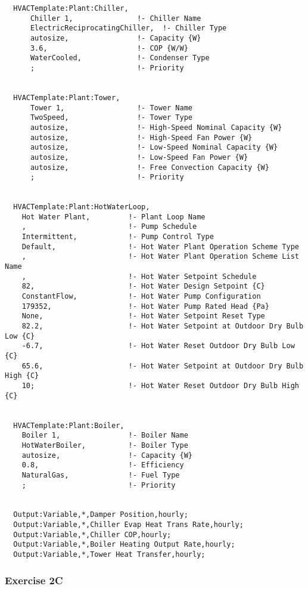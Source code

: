 \begin{lstlisting}
  HVACTemplate:Plant:Chiller,
      Chiller 1,               !- Chiller Name
      ElectricReciprocatingChiller,  !- Chiller Type
      autosize,                !- Capacity {W}
      3.6,                     !- COP {W/W}
      WaterCooled,             !- Condenser Type
      ;                        !- Priority


  HVACTemplate:Plant:Tower,
      Tower 1,                 !- Tower Name
      TwoSpeed,                !- Tower Type
      autosize,                !- High-Speed Nominal Capacity {W}
      autosize,                !- High-Speed Fan Power {W}
      autosize,                !- Low-Speed Nominal Capacity {W}
      autosize,                !- Low-Speed Fan Power {W}
      autosize,                !- Free Convection Capacity {W}
      ;                        !- Priority


  HVACTemplate:Plant:HotWaterLoop,
    Hot Water Plant,         !- Plant Loop Name
    ,                        !- Pump Schedule
    Intermittent,            !- Pump Control Type
    Default,                 !- Hot Water Plant Operation Scheme Type
    ,                        !- Hot Water Plant Operation Scheme List Name
    ,                        !- Hot Water Setpoint Schedule
    82,                      !- Hot Water Design Setpoint {C}
    ConstantFlow,            !- Hot Water Pump Configuration
    179352,                  !- Hot Water Pump Rated Head {Pa}
    None,                    !- Hot Water Setpoint Reset Type
    82.2,                    !- Hot Water Setpoint at Outdoor Dry Bulb Low {C}
    -6.7,                    !- Hot Water Reset Outdoor Dry Bulb Low {C}
    65.6,                    !- Hot Water Setpoint at Outdoor Dry Bulb High {C}
    10;                      !- Hot Water Reset Outdoor Dry Bulb High {C}


  HVACTemplate:Plant:Boiler,
    Boiler 1,                !- Boiler Name
    HotWaterBoiler,          !- Boiler Type
    autosize,                !- Capacity {W}
    0.8,                     !- Efficiency
    NaturalGas,              !- Fuel Type
    ;                        !- Priority


  Output:Variable,*,Damper Position,hourly;
  Output:Variable,*,Chiller Evap Heat Trans Rate,hourly;
  Output:Variable,*,Chiller COP,hourly;
  Output:Variable,*,Boiler Heating Output Rate,hourly;
  Output:Variable,*,Tower Heat Transfer,hourly;
\end{lstlisting}

\subsubsection{Exercise 2C}\label{exercise-2c}

